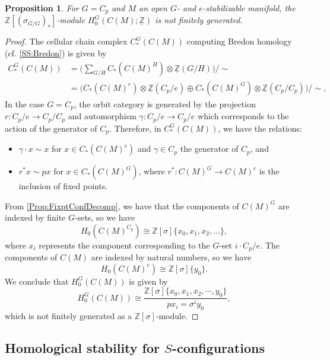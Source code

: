 \documentclass[11pt]{amsart}
\newtheorem{proposition}[equation]{Proposition}
\theoremstyle{definition}
\numberwithin{equation}{subsection} %
\def\z{\mathbb{Z}}
\def\mfz{\underline{\mathbb{Z}}}
\newcommand{\ZZ}{\mathbb Z}
\begin{document}
\begin{proposition} \label{Prop:H0Unstable}
For $G=C_p$ and $M$ an open $G$- and $e$-stabilizable manifold, the $\z[(\sigma_{G/G})_*]$-module $H_0^G(C(M);\mfz)$ is not finitely generated. 
\end{proposition}
\begin{proof}
The cellular chain complex $C^G_*(C(M))$ computing Bredon homology (cf. \cref{SS:Bredon}) is given by
\begin{align*}
C^G_*(C(M)) &= \Big( \sum_{G/H} C_*(C(M)^H)\otimes\mfz(G/H) \Big)/\sim\\
&= \Big( C_*(C(M)^e) \otimes \mfz(C_p/e) \oplus C_*(C(M)^G) \otimes \mfz(C_p/C_p) \Big) /\sim,
\end{align*}
In the case $G=C_p$, the orbit category is generated by the projection $r:C_p/e\to C_p/C_p$ and automorphism $\gamma:C_p/e\to C_p/e$ which corresponds to the action of the generator of $C_p$. Therefore, in $C^G_*(C(M))$, we have the relations:
\begin{itemize}
\item $\gamma\cdot x\sim x$ for $x\in C_*(C(M)^e)$ and $\gamma\in C_p$ the generator of $C_p$, and 
\item $r^*x\sim px$ for $x\in C_*(C(M)^G)$, where $r^*:C(M)^G\to C(M)^e$ is the inclusion of fixed points.
\end{itemize} 
From \cref{Prop:FixptConfDecomp}, we have that the components of $C(M)^G$ are indexed by finite $G$-sets, so we have
$$ H_0(C(M)^{C_p}) \cong \ZZ[\sigma]\{ x_0, x_1, x_2, \ldots \}, $$
where $x_i$ represents the component corresponding to the $G$-set $i\cdot C_p/e$. The components of $C(M)$ are indexed by natural numbers, so we have 
$$ H_0(C(M)^e) \cong \ZZ[\sigma]\{ y_0 \}. $$
We conclude that $H^G_0(C(M))$ is given by
$$ H^G_0(C(M)) \cong \frac{ \ZZ[\sigma]\{ x_0,x_1,x_2,\cdots, y_0 \} }{ px_i = \sigma^i y_0}, $$
which is not finitely generated as a $\ZZ[\sigma]$-module.
\end{proof}

\subsection{Homological stability for $S$-configurations}\label{SS:CGSStability}

\end{document}
